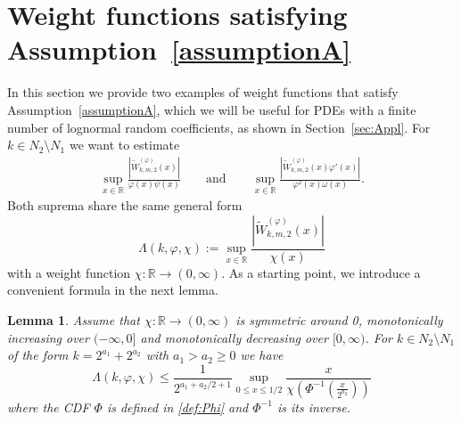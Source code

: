 \documentclass[namedate,webpdf,imanum]{ima-authoring-arxiv}%
\theoremstyle{thmstyletwo}%
\newtheorem{lemma}{Lemma}
\numberwithin{equation}{section}
\newcommand{\RR}{\mathbb{R}}
\begin{document}
\section{Weight functions satisfying Assumption~\ref{assumptionA}}\label{sec:ex:ass:A}

In this section we provide two examples of weight functions that satisfy Assumption~\ref{assumptionA}, which we will be useful for PDEs with a finite number of lognormal random coefficients, as shown in Section~\ref{sec:Appl}. For $k \in N_2 \setminus N_1$ we want to estimate
\begin{align}\label{AssA:int}
\sup_{x \in \mathbb{R}} \frac{|\widetilde{W}^{(\varphi)}_{k, m, 2}(x)|}{\varphi(x) \psi(x)} \qquad \mbox{and} \qquad \sup_{x \in \mathbb{R}} \frac{|\widetilde{W}_{k,m,2}^{(\varphi)}(x)\varphi'(x)|}{\varphi^2(x) \omega(x)}. 
\end{align}
Both suprema share the same general form 
$$\Lambda(k,\varphi,\chi) :=\sup_{x \in \mathbb{R}} \frac{|\widetilde{W}^{(\varphi)}_{k, m, 2}(x)|}{\chi(x)}$$ with a weight function $\chi:\RR \rightarrow (0,\infty)$. As a starting point, we introduce a convenient formula in the next lemma.

\begin{lemma}\label{lem:gen:Lambda}
Assume that $\chi: \RR \rightarrow (0,\infty)$ is symmetric around 0, monotonically increasing over $(-\infty,0]$ and monotonically decreasing over $[0,\infty)$. For $k \in N_2 \setminus N_1$ of the form $k = 2^{a_1} + 2^{a_2}$ with $a_1 > a_2 \ge 0$ we have
$$\Lambda(k,\varphi, \chi) \le \frac{1}{2^{a_1+a_2/2+1}} \sup_{0 \le x \le 1/2} \frac{x}{\chi(\Phi^{-1}(\frac{x}{2^{a_2}}))}$$
where the CDF $\Phi$ is defined in \eqref{def:Phi} and $\Phi^{-1}$ is its inverse.
\end{lemma}
\end{document}
